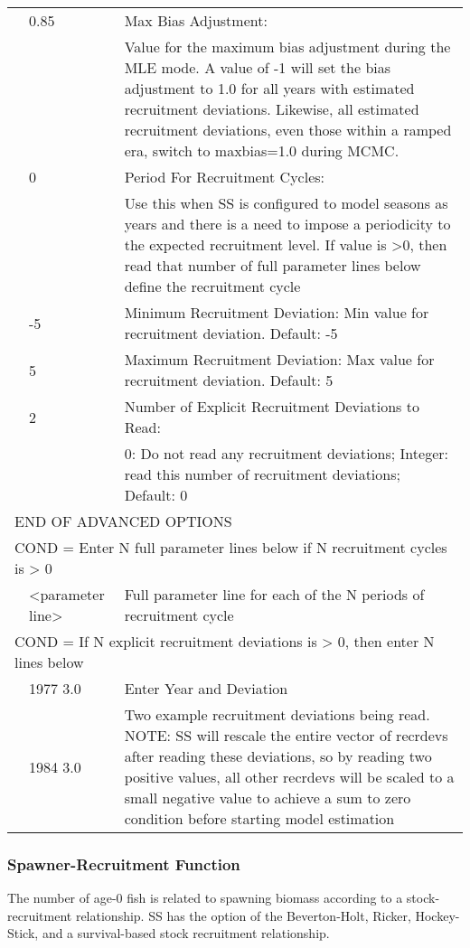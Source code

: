 \begin{center}
\begin{longtable}{p{1cm} p{3cm} p{11cm}}
		& 0.85 & Max Bias Adjustment: \\
		&      & Value for the maximum bias adjustment during the MLE mode. A value of -1 will set the bias adjustment to 1.0 for all years with estimated recruitment deviations. Likewise, all estimated recruitment deviations, even those within a ramped era, switch to maxbias=1.0 during MCMC.\\
		& 0    & Period For Recruitment Cycles: \\
		&      & Use this when SS is configured to model seasons as years and there is a need to impose a periodicity to the expected recruitment level.  If value is >0, then read that number of full parameter lines below define the recruitment cycle \\
		& -5   & Minimum Recruitment Deviation: Min value for recruitment deviation. Default: -5\\
		& 5    & Maximum Recruitment Deviation: Max value for recruitment deviation. Default: 5\\
		& 2    & Number of Explicit Recruitment Deviations to Read:\\
		&      & 0: Do not read any recruitment deviations; Integer: read this number of recruitment deviations; Default:  0 \\
		\multicolumn{3}{l}{END OF ADVANCED OPTIONS}\\
		\hline
		\multicolumn{3}{l}{COND = Enter N full parameter lines below if N recruitment cycles is > 0}\\
		& <parameter line> & Full parameter line for each of the N periods of recruitment cycle\\
		\hline
		\multicolumn{3}{l}{COND = If N explicit recruitment deviations is > 0, then enter N lines below}\\
		& 1977 3.0 & Enter Year and Deviation\\
		& 1984 3.0 & Two example recruitment deviations being read.  NOTE:  SS will rescale the entire vector of recrdevs after reading these deviations, so by reading two positive values, all other recrdevs will be scaled to a small negative value to achieve a sum to zero condition before starting model estimation\\
		\hline
	\end{longtable}
\end{center}

\subsubsection{Spawner-Recruitment Function}
The number of age-0 fish is related to spawning biomass according to a stock-recruitment relationship.  SS has the option of the Beverton-Holt, Ricker, Hockey-Stick, and a survival-based stock recruitment relationship.

